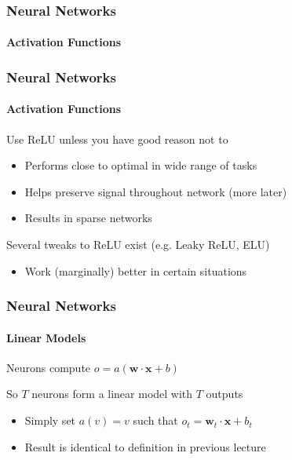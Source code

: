 \documentclass[xetex,professionalfont]{beamer}
\newcommand{\eg}{\mbox{e.g.}\xspace} %
\renewcommand{\vec}[1]{\ensuremath{\mathbf{#1}}}
\newcommand{\vw}{\vec{w}}
\newcommand{\vx}{\vec{x}}
\begin{document}
\begin{frame}
\frametitle{Neural Networks}
\framesubtitle{Activation Functions}

\begin{center}
\end{center}

\end{frame}


\begin{frame}
\frametitle{Neural Networks}
\framesubtitle{Activation Functions}

Use ReLU unless you have good reason not to
\begin{itemize}
    \item Performs close to optimal in wide range of tasks
    \item Helps preserve signal throughout network (more later)
    \item Results in sparse networks %
\end{itemize}

\bigskip

Several tweaks to ReLU exist (\eg Leaky ReLU, ELU)
\begin{itemize}
  \item Work (marginally) better in certain situations
\end{itemize}

  \end{frame}


\begin{frame}
\frametitle{Neural Networks}
\framesubtitle{Linear Models}

Neurons compute $o=a(\vw\cdot\vx+b)$

\bigskip

So $T$ neurons form a linear model with $T$ outputs
\begin{itemize}
    \item Simply set $a(v)=v$ such that $o_t=\vw_t\cdot\vx+b_t$
    \item Result is identical to definition in previous lecture
\end{itemize}

\end{frame}
\end{document}
